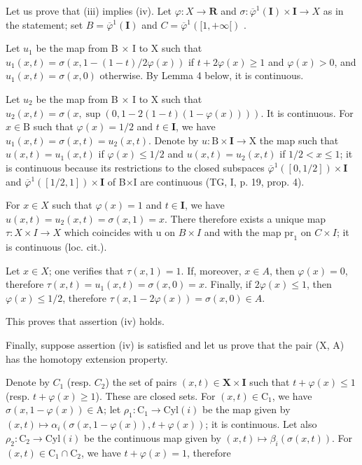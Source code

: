 Let us prove that (iii) implies (iv). Let \(\varphi\colon X\to\mathbf{R}\) and \(\sigma\colon\overline{\varphi}^{1}(\mathbf{I})\times\mathbf{I}\to X\) as in the statement; set \(B=\overline{\varphi}^{1}(\mathbf{I})\) and \(C=\overline{\varphi}^{1}([1,+\infty[)\) .

Let \(u_1\) be the map from B × I to X such that \(u_1(x,t) = \sigma(x,1 - (1 - t)/2\varphi(x))\) if \(t + 2\varphi(x) \geqslant 1\) and \(\varphi(x) > 0\), and \(u_1(x,t) = \sigma(x,0)\) otherwise. By Lemma 4 below, it is continuous.

Let \(u_2\) be the map from B × I to X such that \(u_2(x,t)=\sigma(x,\sup(0,1-2(1-t)(1-\varphi(x))))\). It is continuous. For \(x\in\mathrm{B}\) such that \(\varphi(x)=1/2\) and \(t\in\mathbf{I}\), we have \(u_1(x,t)=\sigma(x,t)=u_2(x,t)\). Denote by \(u:\mathrm{B}\times\mathbf{I}\to\mathrm{X}\) the map such that \(u(x,t)=u_1(x,t)\) if \(\varphi(x)\leqslant1/2\) and \(u(x,t)=u_2(x,t)\) if \(1/2<x\leqslant1\); it is continuous because its restrictions to the closed subspaces \(\overline{\varphi}^{1}([0,1/2])\times\mathbf{I}\) and \(\overline{\varphi}^{1}([1/2,1])\times\mathbf{I}\) of B×I are continuous (TG, I, p. 19, prop. 4).

For \(x\in X\) such that \(\varphi(x)=1\) and \(t\in\mathbf{I}\), we have \(u(x,t)=u_2(x,t)=\sigma(x,1)=x\). There therefore exists a unique map \(\tau:X\times I\to X\) which coincides with u on \(B\times I\) and with the map \(\mathrm{pr}_1\) on \(C\times I\); it is continuous (loc. cit.).

Let \(x \in X\); one verifies that \(\tau(x,1) = 1\). If, moreover, \(x \in A\), then \(\varphi(x) = 0\), therefore \(\tau(x,t) = u_{1}(x,t) = \sigma(x,0) = x\). Finally, if \(2\varphi(x) \leqslant 1\), then \(\varphi(x) \leqslant 1/2\), therefore \(\tau(x,1 - 2\varphi(x)) = \sigma(x,0) \in A\).

This proves that assertion (iv) holds.

Finally, suppose assertion (iv) is satisfied and let us prove that the pair (X, A) has the homotopy extension property.

Denote by \(C_{1}\) (resp. \(C_{2}\)) the set of pairs \((x,t)\in\mathbf{X}\times\mathbf{I}\) such that \(t+\varphi(x)\leqslant1\) (resp. \(t+\varphi(x)\geqslant1\)). These are closed sets. For \((x,t)\in\mathrm{C}_{1}\), we have \(\sigma(x,1-\varphi(x))\in\mathrm{A}\); let \(\rho_{1}\colon\mathrm{C}_{1}\to\mathrm{Cyl}(i)\) be the map given by \((x,t)\mapsto\alpha_{i}(\sigma(x,1-\varphi(x)),t+\varphi(x))\); it is continuous. Let also \(\rho_{2}\colon\mathrm{C}_{2}\to\mathrm{Cyl}(i)\) be the continuous map given by \((x,t)\mapsto\beta_{i}(\sigma(x,t))\). For \((x,t)\in\mathrm{C}_{1}\cap\mathrm{C}_{2}\), we have \(t+\varphi(x)=1\), therefore

